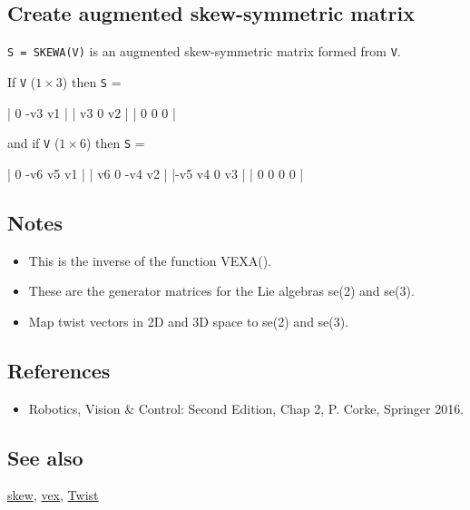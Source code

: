 \subsection*{Create augmented skew-symmetric matrix}


\texttt{S = SKEWA(V)} is an augmented skew-symmetric matrix formed from \texttt{V}.



If \texttt{V} ($1 \times 3$) then \texttt{S} =

\begin{Code}
     |  0  -v3  v1 |
     | v3    0  v2 |
     |  0    0   0 |

\end{Code}


and if \texttt{V} ($1 \times 6$) then \texttt{S} =

\begin{Code}
     |  0  -v6   v5  v1 |
     | v6    0  -v4  v2 |
     |-v5   v4    0  v3 |
     |  0    0    0   0 |

\end{Code}

\subsection*{Notes}
\begin{itemize}
  \item This is the inverse of the function VEXA().
  \item These are the generator matrices for the Lie algebras se(2) and se(3).
  \item Map twist vectors in 2D and 3D space to se(2) and se(3).
\end{itemize}

\subsection*{References}
\begin{itemize}
  \item Robotics, Vision \& Control: Second Edition, Chap 2,    P. Corke, Springer 2016.
\end{itemize}

\subsection*{See also}


\hyperlink{skew}{\color{blue} skew}, \hyperlink{vex}{\color{blue} vex}, \hyperlink{Twist}{\color{blue} Twist}

